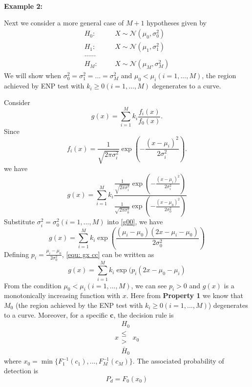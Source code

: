 \noindent \textbf{Example 2:}

Next we consider a more general case of $M+1$ hypotheses given by 
\begin{equation}
\label{equ: m+1 Gaussian Hypo}
\begin{split}
H_0:\;\;\;\;\;\;&X\sim \mathcal{N}(\mu_0, \sigma_0^2)\\
H_1:\;\;\;\;\;\;&X\sim \mathcal{N}(\mu_1, \sigma_1^2)\\
  ......\\
H_M:\;\;\;\;\;\;&X\sim \mathcal{N}(\mu_M, \sigma_M^2)
\end{split}
\end{equation}
We will show when $\sigma_0^2 = \sigma_1^2 = ... = \sigma_M^2$ and $\mu_0 < \mu_i (i = 1, ..., M)$, the region achieved by ENP test with $k_i \geq 0 (i = 1, ..., M)$ degenerates to a curve.

Consider
\begin{equation}
\label{equ: define gx}
g(x) = \sum_{i=1}^{M}k_i\frac{f_i(x)}{f_0(x)}.
\end{equation}
Since 
\begin{equation}
\label{equ: gaussian PDF}
f_i(x) = \frac{1}{\sqrt{2\pi\sigma_i^2}}\exp(-\frac{(x-\mu_i)^2}{2\sigma_i^2}).
\end{equation}
we have
\begin{equation}
\label{g00}
g(x) = \sum_{i=1}^{M}k_i\frac{\frac{1}{\sqrt{2\pi\sigma_i^2}}\exp(-\frac{(x-\mu_i)^2}{2\sigma_i^2})}{\frac{1}{\sqrt{2\pi\sigma_0^2}}\exp(-\frac{(x-\mu_0)^2}{2\sigma_0^2})}
\end{equation}
Substitute  $\sigma_i^2 = \sigma_0^2 (i = 1, ..., M)$ into \eqref{g00}, we have 
\begin{equation}
\label{equ: gx cc}
g(x) = \sum_{i=1}^{M}k_i\exp(\frac{(\mu_i - \mu_0)(2x-\mu_i - \mu_0)}{2\sigma_0^2})
\end{equation}
Defining $p_i = \frac{\mu_i - \mu_0}{2\sigma_0^2}$, \eqref{equ: gx cc} can be written as
\begin{equation}
g(x) = \sum_{i=1}^{M}k_i\exp(p_i(2x-\mu_0 - \mu_i)
\end{equation}
From the condition $\mu_0 < \mu_i (i=1, ..., M)$, we can see $p_i >0$ and  $g(x)$ is a monotonically increasing function with $x$. Here from \textbf{Property 1} we know that $M_0$ (the region achieved by the ENP test with $k_i \geq 0 (i=1, ..., M)$) degenerates to a curve. Moreover, for a specific $\mathbf{c}$, the decision rule is 
\[
x \substack{H_0 \\ \leq \\ > \\ \bar{H}_0} x_0
\]
where $x_0 = \min\{F_1^{-1}(c_1), ..., F_M^{-1}(c_M)\}$. The associated probability of detection is
\[
P_d = F_0(x_0)
\]

